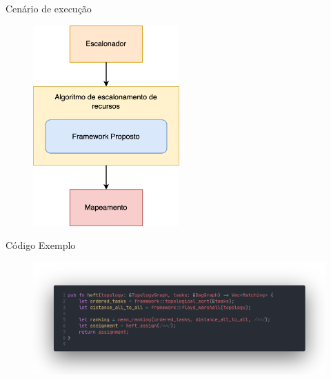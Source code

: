 
\begin{frame}{Cenário de execução}
    \begin{figure}
        \centering
        \includegraphics[width=0.5\textwidth]{Figuras/framework_usage.png}
    \end{figure}
\end{frame}

\begin{frame}{Código Exemplo}
    \begin{figure}
        \centering
        \includegraphics[width=\textwidth]{Figuras/code.png}
    \end{figure}
\end{frame}


